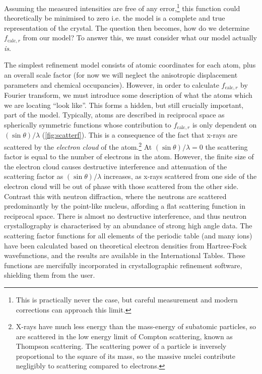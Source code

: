 \begin{refsection}
Assuming the measured intensities are free of any error,\footnote{This is practically never the case, but careful measurement and modern corrections can approach this limit.} this function could theoretically be minimised to zero i.e. the model is a complete and true representation of the crystal.
The question then becomes, how do we determine $f_{\mathrm{calc}, r}$ from our model?
To answer this, we must consider what our model actually \emph{is}.

The simplest refinement model consists of atomic coordinates for each atom, plus an overall scale factor (for now we will neglect the anisotropic displacement parameters and chemical occupancies).
However, in order to calculate $f_{\mathrm{calc}, r}$ by Fourier transform, we must introduce some description of what the atoms which we are locating ``look like''.
This forms a hidden, but still crucially important, part of the model.
Typically, atoms are described in reciprocal space as spherically symmetric functions whose contribution to $f_{\mathrm{calc}, r}$ is only dependent on $(\sin\theta)/\lambda$ (\cref{fig:scatterf}).
This is a consequence of the fact that x-rays are scattered by the \emph{electron cloud} of the atom.\footnote{X-rays have much less energy than the mass-energy of subatomic particles, so are scattered in the low energy limit of Compton scattering, known as Thompson scattering.
The scattering power of a particle is inversely proportional to the square of its mass, so the massive nuclei contribute negligibly to scattering compared to electrons.}
At $(\sin\theta)/\lambda = 0$ the scattering factor is equal to the number of electrons in the atom.
However, the finite size of the electron cloud causes destructive interference and attenuation of the scattering factor as $(\sin\theta)/\lambda$ increases, as x-rays scattered from one side of the electron cloud will be out of phase with those scattered from the other side.
Contrast this with neutron diffraction, where the neutrons are scattered predominantly by the point-like nucleus, affording a flat scattering function in reciprocal space.
There is almost no destructive interference, and thus neutron crystallography is characterised by an abundance of strong high angle data.
The scattering factor functions for all elements of the periodic table (and many ions) have been calculated based on theoretical electron densities from Hartree-Fock wavefunctions, and the results are available in the International Tables.\autocite{IntTabCIntensityofdiffractedintensities}
These functions are mercifully incorporated in crystallographic refinement software, shielding them from the user.


\end{refsection}
